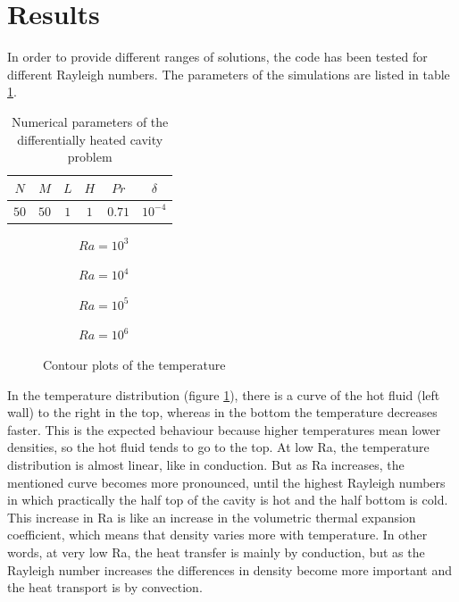 \section{Results}
In order to provide different ranges of solutions, the code has been tested for different Rayleigh numbers. The parameters of the simulations are listed in table \ref{NumericalParamDiffHeated}.
\begin{table}[H]
	\centering
	\begin{tabular}{ |c|c|c|c|c|c| }
		\hline
		$N$ & $M$ & $L$ & $H$ & $Pr$ & $\delta$ \\ \hline
		$50$ & $50$ & $1$ & $1$ & $0.71$ & $10^{-4}$ \\ \hline
	\end{tabular}
\caption{Numerical parameters of the differentially heated cavity problem}
\label{NumericalParamDiffHeated}
\end{table}
\begin{figure}[h]
	\begin{subfigure}{0.5\textwidth}
		\resizebox{1.4\textwidth}{!}{}
		\caption{$Ra=10^{3}$}
	\end{subfigure}%
	\begin{subfigure}{0.5\textwidth}
		\resizebox{1.4\textwidth}{!}{}
		\caption{$Ra=10^{4}$}
	\end{subfigure}
	\begin{subfigure}{0.5\textwidth}
		\resizebox{1.4\textwidth}{!}{}
		\caption{$Ra=10^{5}$}
	\end{subfigure}%
	\begin{subfigure}{0.5\textwidth}
		\resizebox{1.4\textwidth}{!}{}
		\caption{$Ra=10^{6}$}
	\end{subfigure}
	\caption{Contour plots of the temperature}
	\label{TemperatureDiffHeated}
\end{figure}
In the temperature distribution (figure \ref{TemperatureDiffHeated}), there is a curve of the hot fluid (left wall) to the right in the top, whereas in the bottom the temperature decreases faster. This is the expected behaviour because higher temperatures mean lower densities, so the hot fluid tends to go to the top. At low Ra, the temperature distribution is almost linear, like in conduction. But as Ra increases, the mentioned curve becomes more pronounced, until the highest Rayleigh numbers in which practically the half top of the cavity is hot and the half bottom is cold. This increase in Ra is like an increase in the volumetric thermal expansion coefficient, which means that density varies more with temperature. In other words, at very low Ra, the heat transfer is mainly by conduction, but as the Rayleigh number increases the differences in density become more important and the heat transport is by convection.

